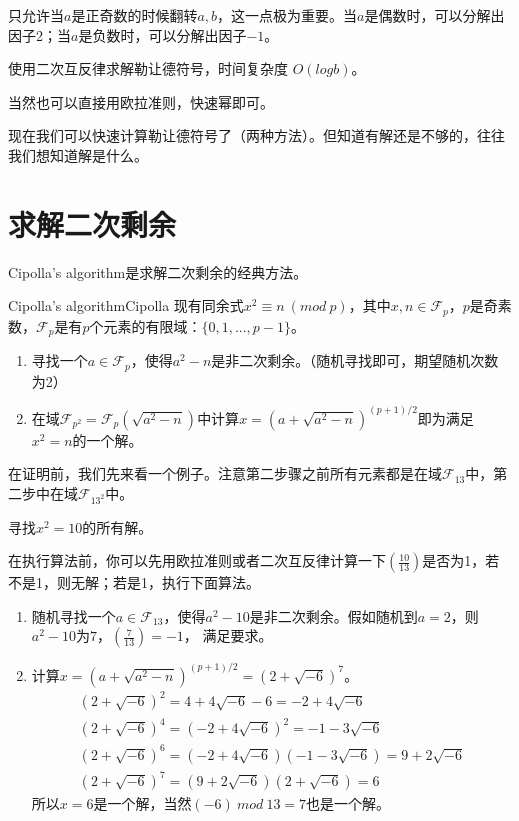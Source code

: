 \begin{note}
只允许当$a$是正奇数的时候翻转$a,b$，这一点极为重要。当$a$是偶数时，可以分解出因子2；当$a$是负数时，可以分解出因子$-1$。
\end{note}

\vbox{}

使用二次互反律求解勒让德符号，时间复杂度  $O(logb)$。

{\heiti 当然也可以直接用欧拉准则，快速幂即可。}



现在我们可以快速计算勒让德符号了（两种方法）。{\heiti 但知道有解还是不够的，往往我们想知道解是什么。}


\section{求解二次剩余}
Cipolla's algorithm是求解二次剩余的经典方法。
\begin{theorem}{Cipolla's algorithm}{Cipolla}
现有同余式$x^2\equiv n\ (mod\ p)$，其中$x,n\in \mathcal{F}_p$，$p$是奇素数，$\mathcal{F}_p$是有$p$个元素的有限域：$\{0,1,...,p-1\}$。
\begin{enumerate}
\item 寻找一个$a\in \mathcal{F}_p$，使得$a^2-n$是非二次剩余。（随机寻找即可，期望随机次数为2）
\item 在域$\mathcal{F}_{p^2}=\mathcal{F}_p(\sqrt{a^2-n})$中计算$x = (a+\sqrt{a^2-n})^{(p+1)/2}$即为满足$x^2=n$的一个解。
\end{enumerate}
\end{theorem}

在证明前，我们先来看一个例子。注意第二步骤之前所有元素都是在域$\mathcal{F}_{13}$中，第二步中在域$\mathcal{F}_{13^2}$中。

寻找$x^2=10$的所有解。

在执行算法前，你可以先用欧拉准则或者二次互反律计算一下$\left(  \frac{10}{13}  \right)$是否为1，若不是1，则无解；若是1，执行下面算法。

\begin{enumerate}
\item 随机寻找一个$a\in \mathcal{F}_{13}$，使得$a^2-10$是非二次剩余。假如随机到$a=2$，则$a^2-10$为$7$，$\left(  \frac{7}{13}  \right)=-1$，
满足要求。
\item 计算$x = (a+\sqrt{a^2-n})^{(p+1)/2} = (2+\sqrt{-6})^7$。
$$
\begin{array}{l}{(2+\sqrt{-6})^{2}=4+4 \sqrt{-6}-6=-2+4 \sqrt{-6}} \\ {(2+\sqrt{-6})^{4}=(-2+4 \sqrt{-6})^{2}=-1-3 \sqrt{-6}} \\ {(2+\sqrt{-6})^{6}=(-2+4 \sqrt{-6})(-1-3 \sqrt{-6})=9+2 \sqrt{-6}} \\ {(2+\sqrt{-6})^{7}=(9+2 \sqrt{-6})(2+\sqrt{-6})=6}\end{array}
$$
所以$x=6$是一个解，当然$(-6)\ mod\ 13 = 7$也是一个解。
\end{enumerate}

